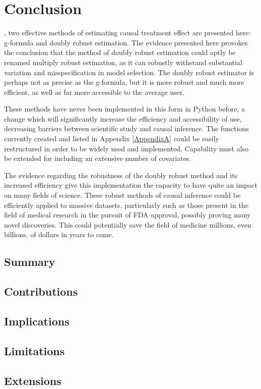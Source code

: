 \chapter{Conclusion}
\label{conclusion}

, two effective methods of estimating causal treatment effect are presented here: g-formula and doubly robust estimation.  The evidence presented here provokes the conclusion that the method of doubly robust estimation could aptly be renamed multiply robust estimation, as it can robustly withstand substantial variation and misspecification in model selection.  The doubly robust estimator is perhaps not as precise as the g-formula, but it is more robust and much more efficient, as well as far more accessible to the average user. 

These methods have never been implemented in this form in Python before, a change which will significantly increase the efficiency and accessibility of use, decreasing barriers between scientific study and causal inference.  The functions currently created and listed in Appendix \ref{AppendixA} could be easily restructured in order to be widely used and implemented.  Capability must also be extended for including an extensive number of covariates.  

The evidence regarding the robustness of the doubly robust method and its increased efficiency give this implementation the capacity to have quite an impact on many fields of science.  These robust methods of causal inference could be efficiently applied to massive datasets, particularly such as those present in the field of medical research in the pursuit of FDA approval, possibly proving many novel discoveries.  This could potentially save the field of medicine millions, even billions, of dollars in years to come.  



\section{Summary} 

\section{Contributions}

\section{Implications}

\section{Limitations}

\section{Extensions} 